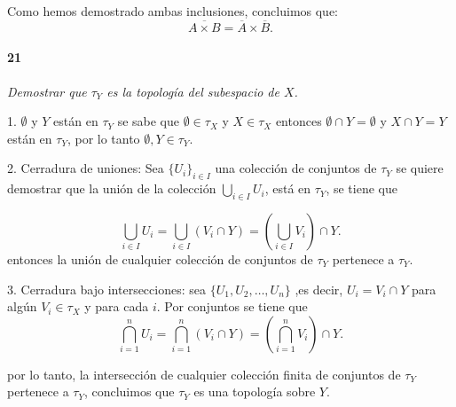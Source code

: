 \documentclass[12pt]{article}
\begin{document}
Como hemos demostrado ambas inclusiones, concluimos que:
\[
\overline{A \times B} = \overline{A} \times \overline{B}.
\]

\paragraph{21}
\textit{Demostrar que \(\tau_Y\) es la topología del subespacio de \( X \).}

1. \( \emptyset \) y \( Y \) est\'an en \( \tau_Y \) se sabe que \( \emptyset \in \tau_X \) y \( X \in \tau_X \)
entonces \( \emptyset \cap Y = \emptyset \) y \( X \cap Y = Y \) están en \( \tau_Y \), por lo tanto \( \emptyset, Y \in \tau_Y \).

2. Cerradura de uniones: Sea \( \{ U_i \}_{i \in I} \) una colecci\'on de conjuntos de \( \tau_Y \)
se quiere demostrar que la unión de la colecci\'on \( \bigcup_{i \in I} U_i \), está en \( \tau_Y \), se tiene que

\[
\bigcup_{i \in I} U_i = \bigcup_{i \in I} (V_i \cap Y) = \left( \bigcup_{i \in I} V_i \right) \cap Y.
\]
entonces la unión de cualquier colecci\'on de conjuntos de \( \tau_Y \) pertenece a \( \tau_Y \).

3. Cerradura bajo intersecciones: sea \( \{ U_1, U_2, \dots, U_n \} \) ,es decir, \( U_i = V_i \cap Y \) para algún \( V_i \in \tau_X \) y para cada \( i \). 
Por conjuntos se tiene que
\[
\bigcap_{i=1}^n U_i = \bigcap_{i=1}^n (V_i \cap Y) = \left( \bigcap_{i=1}^n V_i \right) \cap Y.
\]

por lo tanto, la intersección de cualquier colecci\'on finita de conjuntos de \( \tau_Y \) pertenece a \( \tau_Y \), 
concluimos que \( \tau_Y \) es una topolog\'ia sobre \( Y \).
\end{document}
